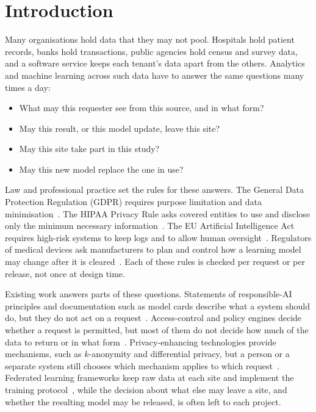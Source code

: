 \section{Introduction}
\label{sec:introduction}

Many organisations hold data that they may not pool. Hospitals hold patient
records, banks hold transactions, public agencies hold census and survey data,
and a software service keeps each tenant's data apart from the others.
Analytics and machine learning across such data have to answer the same
questions many times a day:
\begin{itemize}
  \item What may this requester see from this source, and in what form?
  \item May this result, or this model update, leave this site?
  \item May this site take part in this study?
  \item May this new model replace the one in use?
\end{itemize}

Law and professional practice set the rules for these answers. The General
Data Protection Regulation (GDPR) requires purpose limitation and data
minimisation~\citep{eu2016gdpr}. The HIPAA Privacy Rule asks covered entities to
use and disclose only the minimum necessary information~\citep{hhs2026minimum}.
The EU Artificial Intelligence Act requires high-risk systems to keep logs and
to allow human oversight~\citep{eu2024aiact}. Regulators of medical devices ask
manufacturers to plan and control how a learning model may change after it is
cleared~\citep{fda2024pccp}. Each of these rules is checked per request or per
release, not once at design time.

Existing work answers parts of these questions. Statements of responsible-AI
principles and documentation such as model cards describe what a system should
do, but they do not act on a request~\citep{jobin2019global,mitchell2019model}.
Access-control and policy engines decide whether a request is permitted, but
most of them do not decide how much of the data to return or in what
form~\citep{hu2014guide}. Privacy-enhancing technologies provide mechanisms, such
as \(k\)-anonymity and differential privacy, but a person or a separate system
still chooses which mechanism applies to which
request~\citep{sweeney2002kanonymity,dwork2014algorithmic}. Federated learning
frameworks keep raw data at each site and implement the training
protocol~\citep{mcmahan2017communication,kairouz2021advances}, while the
decision about what else may leave a site, and whether the resulting model may
be released, is often left to each project.

